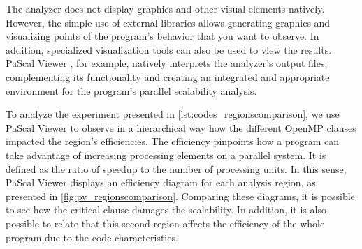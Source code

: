 The analyzer does not display graphics and other visual elements natively. However, the simple use of external libraries allows generating graphics and visualizing points of the program's behavior that you want to observe. In addition, specialized visualization tools can also be used to view the results. PaScal Viewer \cite{Silva2018}, for example, natively interprets the analyzer's output files, complementing its functionality and creating an integrated and appropriate environment for the program's parallel scalability analysis.

To analyze the experiment presented in \cref{lst:codes_regionscomparison}, we use PaScal Viewer to observe in a hierarchical way how the different OpenMP clauses impacted the region's efficiencies. The efficiency pinpoints how a program can take advantage of increasing processing elements on a parallel system. It is defined as the ratio of speedup to the number of processing units. In this sense, PaScal Viewer displays an efficiency diagram for each analysis region, as presented in \cref{fig:pv_regionscomparison}. Comparing these diagrams, it is possible to see how the critical clause damages the scalability. In addition, it is also possible to relate that this second region affects the efficiency of the whole program due to the code characteristics.

